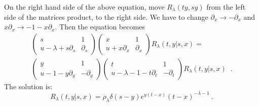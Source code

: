 \documentclass[a4paper,11pt]{article}
\begin{document}
On the right hand side of the above equation, move $R_{\lambda}(ty,sy)$ from
the left side of the matrices product, to the right side. We have to change
$\partial_x \to -\partial_x$ and $x\partial_x \to -1-x\partial_x.$ Then the
equation becomes
\begin{eqnarray}
\label{mlquatum2}
\left(\begin{array}{cc}
          s      & 1  \\
           u-\lambda +s\partial_s    &  \partial_s
         \end{array}\right )\left(\begin{array}{cc}
          x      & 1  \\
           u+x\partial_x     &  \partial_x
         \end{array}\right )R_{\lambda}(t,y|s,x)=\\ \nonumber
         \left(\begin{array}{cc}
          y     & 1  \\
           u-1-y\partial_y    &  -\partial_y
         \end{array}\right )\left(\begin{array}{cc}
          t      & 1  \\
           u-\lambda-1-t\partial_t    &  -\partial_t
         \end{array}\right )R_{\lambda}(t,y|s,x)\;\;.
\end{eqnarray}
The solution is:
\begin{equation}
\label{R}
R_{\lambda}(t,y|s,x)=\rho_{\lambda}\delta(s-y)e^{y(t-x)}(t-x)^{-\lambda-1} ~.
\end{equation}
\end{document}
